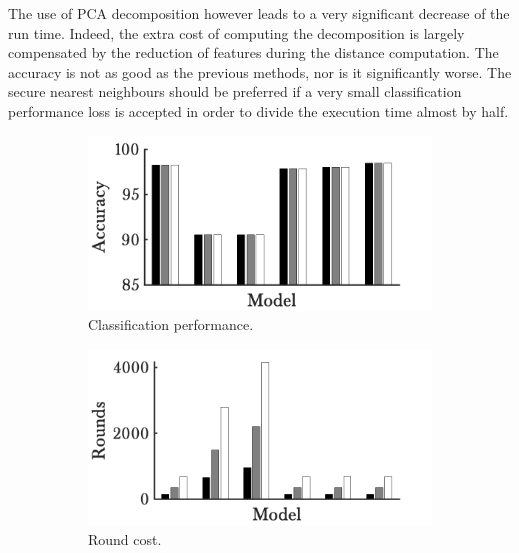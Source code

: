 The use of PCA decomposition however leads to a very significant decrease of the run time. Indeed, the extra cost of computing the decomposition is largely compensated by the reduction of features during the distance computation. The accuracy is not as good as the previous methods, nor is it significantly worse. The secure nearest neighbours should be preferred if a very small classification performance loss is accepted in order to divide the execution time almost by half.

\begin{figure}[h!]
        \begin{subfigure}[b]{.49\textwidth}  
            \centering 
            \includegraphics[width=.98\textwidth]{parts/chap-4/img-knn/knn-timing/acc.png}
            \caption{Classification performance.} 
        \end{subfigure}
        \hfill
        \begin{subfigure}[b]{.49\textwidth}   
            \centering 
            \includegraphics[width=.98\textwidth]{parts/chap-4/img-knn/knn-timing/rounds.png}
            \caption{Round cost.} 
        \end{subfigure}
        \hfill
        \begin{subfigure}[b]{.49\textwidth}   

\end{subfigure}
\end{figure}
